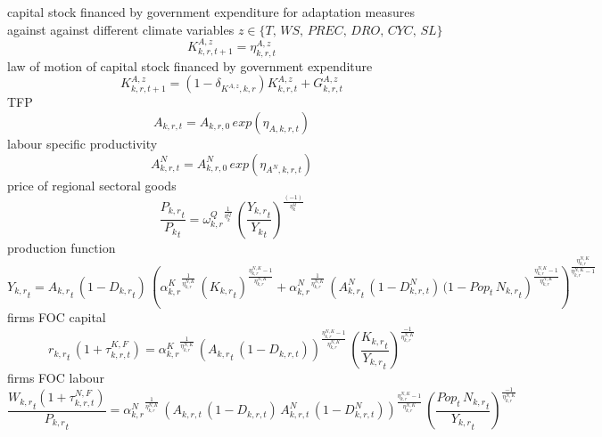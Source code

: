 capital stock financed by government expenditure for adaptation measures against against different climate variables $z \in \{T,\, WS,\, PREC, \, DRO,\, CYC,\, SL\}$
\begin{dmath}
K^{A,z}_{k,r,t+1}=\eta^{A,z}_{k,r,t}
\end{dmath}
law of motion of capital stock financed by government expenditure
\begin{dmath}
K^{A,z}_{k,r,t+1}= (1 - \delta_{K^{A,z},k,r}) K^{A,z}_{k,r,t} + G^{A,z}_{k,r,t}
\end{dmath}
TFP
\begin{dmath}
A_{k,r,t}= A_{k,r,0} \, exp\left({\eta_{A,k,r,t}}\right)
\end{dmath}
labour specific productivity
\begin{dmath}
A^{N}_{k,r,t}= A^{N}_{k,r,0} \, exp\left({\eta_{A^{N},k,r,t}}\right)
\end{dmath}
price of regional sectoral goods
\begin{dmath}
\frac{{{P_{k,r}}_{t}}}{{{P_k}_{t}}}={{\omega^{Q}_{k,r}}}^{\frac{1}{{{\eta^{Q}_{k}}}}}\, \left(\frac{{{Y_{k,r}}_{t}}}{{{Y_k}_{t}}}\right)^{\frac{\left(-1\right)}{{{\eta^{Q}_{k}}}}}
\end{dmath}
production function
\begin{dmath}
{{Y_{k,r}}_{t}}={{A_{k,r}}_{t}}\, \left(1-{{D_{k,r}}_{t}}\right)\, \left({{\alpha^{K}_{k,r}}}^{\frac{1}{{{\eta^{N,K}_{k,r}}}}}\, \left({{K_{k,r}}_{t}}\right)^{\frac{{{\eta^{N,K}_{k,r}}}-1}{{{\eta^{N,K}_{k,r}}}}}+{{\alpha^{N}_{k,r}}}^{\frac{1}{{{\eta^{N,K}_{k,r}}}}}\, \left({{A^{N}_{k,r}}_{t}} \, (1 - D^{N}_{k,r,t}) \, (1 -  {Pop_{t}}\, {{N_{k,r}}_{t}}\right)^{\frac{{{\eta^{N,K}_{k,r}}}-1}{{{\eta^{N,K}_{k,r}}}}}\right)^{\frac{{{\eta^{N,K}_{k,r}}}}{{{\eta^{N,K}_{k,r}}}-1}}
\end{dmath}
firms FOC capital
\begin{dmath}
{{r_{k,r}}_{t}} \, \left(1+\tau^{K,F}_{k,r,t}\right)={{\alpha^{K}_{k,r}}}^{\frac{1}{{{\eta^{N,K}_{k,r}}}}}\, \left({A_{k,r}}_{t} \, (1 - D_{k,r,t})\right)^{\frac{{{\eta^{N,K}_{k,r}}}-1}{{{\eta^{N,K}_{k,r}}}}}\, \left(\frac{{{K_{k,r}}_{t}}}{{{Y_{k,r}}_{t}}}\right)^{\frac{-1}{{{\eta^{N,K}_{k,r}}}}}
\end{dmath}
firms FOC labour
\begin{dmath}
\frac{{{W_{k,r}}_{t}}\left(1+\tau^{N,F}_{k,r,t}\right)}{{{P_{k,r}}_{t}}}={{\alpha^{N}_{k,r}}}^{\frac{1}{{{\eta^{N,K}_{k,r}}}}}\, \left(A_{k,r,t} \, (1 - D_{k,r,t}) \, A^{N}_{k,r,t} \, (1 - D^{N}_{k,r,t})\right)^{\frac{\eta^{N,K}_{k,r}-1}{\eta^{N,K}_{k,r}}} \, \left(\frac{{Pop_{t}}\, {{N_{k,r}}_{t}}}{{{Y_{k,r}}_{t}}}\right)^{\frac{-1}{{{\eta^{N,K}_{k,r}}}}}
\end{dmath}

